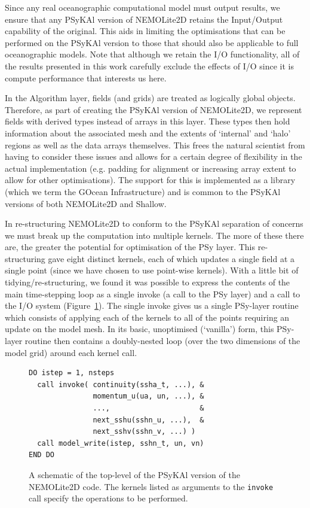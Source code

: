 \documentclass[gmd, manuscript]{copernicus}
\begin{document}
Since any real oceanographic computational model must output results,
we ensure that any {PS}y{KA}l version of NEMOLite2D retains the Input/Output
capability of the original. This aids in limiting the optimisations
that can be performed on the {PS}y{KA}l version to those that should also
be applicable to full oceanographic models. Note that although we
retain the I/O functionality, all of the results presented in this work
carefully exclude the effects of I/O since it is compute performance
that interests us here.

In the Algorithm layer, fields (and grids) are treated as logically
global objects. Therefore, as part of creating the {PS}y{KA}l version
of NEMOLite2D, we represent fields with derived types instead of
arrays in this layer. These types then hold information about the
associated mesh and the extents of `internal' and `halo' regions as
well as the data arrays themselves. This frees the natural scientist
from having to consider these issues and allows for a certain degree
of flexibility in the actual implementation (e.g. padding for
alignment or increasing array extent to allow for other
optimisations). The support for this is implemented as a library
(which we term the GOcean Infrastructure) and is common to the
{PS}y{KA}l versions of both NEMOLite2D and Shallow.

In re-structuring NEMOLite2D to conform to the {PS}y{KA}l separation
of concerns we must break up the computation into multiple
kernels. The more of these there are, the greater the potential for
optimisation of the {PS}y layer. This re-structuring gave eight distinct
kernels, each of which updates a single field at a single point (since
we have chosen to use point-wise kernels). With a little bit of
tidying/re-structuring, we found it was possible to express the
contents of the main time-stepping loop as a single invoke (a call to
the PSy layer) and a call to the I/O system
(Figure~\ref{FIG_psykal_nemolite2d_structure}). The single invoke
gives us a single PSy-layer routine which consists of applying each of
the kernels to all of the points requiring an update on the model
mesh. In its basic, unoptimised (`vanilla') form, this PSy-layer
routine then contains a doubly-nested loop (over the two dimensions of
the model grid) around each kernel call.

\begin{figure}
\centering
\begin{verbatim}
DO istep = 1, nsteps
  call invoke( continuity(ssha_t, ...), &
               momentum_u(ua, un, ...), &
               ...,                     &
               next_sshu(sshn_u, ...),  &
               next_sshv(sshn_v, ...) )
  call model_write(istep, sshn_t, un, vn)
END DO
\end{verbatim}
\caption{A schematic of the top-level of the {PS}y{KA}l version of the
  NEMOLite2D code. The kernels listed as arguments to the \texttt{invoke}
call specify the operations to be performed.}
\label{FIG_psykal_nemolite2d_structure}
\end{figure}
\end{document}
